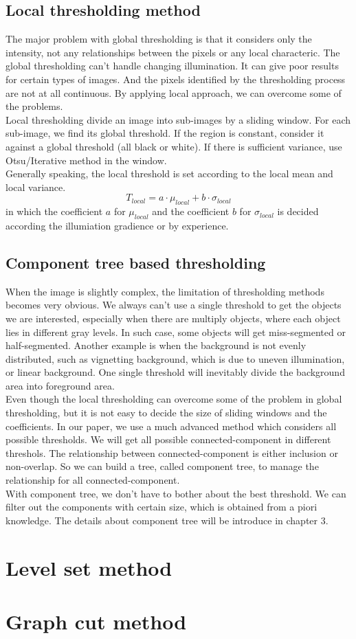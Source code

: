 \subsection{Local thresholding method}
The major problem with global thresholding is that it considers only the intensity, not any relationships between the pixels or any local characteric. The global thresholding can't handle changing illumination. It can give poor results for certain types of images. And the pixels identified by the thresholding process are not at all continuous. By applying local approach, we can overcome some of the problems.\\
Local thresholding divide an image into sub-images by a sliding window. For each sub-image, we find its global threshold. If the region is constant, consider it against a global threshold (all black or white). If there is sufficient variance, use Otsu/Iterative method in the window. \\
Generally speaking, the local threshold is set according to the local mean and local variance.
$$
T_{local} = a\cdot\mu_{local} + b\cdot\sigma_{local}
$$
in which the coefficient $a$ for $\mu_{local}$ and the coefficient $b$ for $\sigma_{local}$ is decided according the illumiation gradience or by experience.
\subsection{Component tree based thresholding}
When the image is slightly complex, the limitation of thresholding methods becomes very obvious. We always can't use a single threshold to get the objects we are interested, especially when there are multiply objects, where each object lies in different gray levels. In such case, some objects will get miss-segmented or half-segmented. Another example is when the background is not evenly distributed, such as vignetting background, which is due to uneven illumination, or linear background. One single threshold will inevitably divide the background area into foreground area.\\
Even though the local thresholding can overcome some of the problem in global thresholding, but it is not easy to decide the size of sliding windows and the coefficients. In our paper, we use a much advanced method which considers all possible thresholds. We will get all possible connected-component in different threshols. The relationship between connected-component is either inclusion or non-overlap. So we can build a tree, called component tree, to manage the relationship for all connected-component. \\
With component tree, we don't have to bother about the best threshold. We can filter out the components with certain size, which is obtained from a piori knowledge. The details about component tree will be introduce in chapter 3.
\section{Level set method}
\section{Graph cut method}


